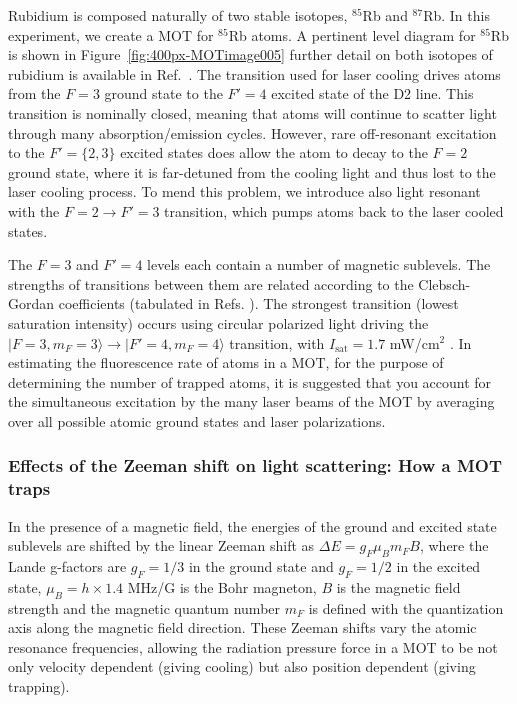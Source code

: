 \documentclass{../lab}
\begin{document}
Rubidium is composed naturally of two stable isotopes, $^{85}$Rb and $^{87}$Rb. In this experiment, we create a MOT for $^{85}$Rb atoms. A pertinent level diagram for $^{85}$Rb is shown in Figure~\ref{fig:400px-MOTimage005} further detail on both isotopes of rubidium is available in Ref.~\cite{Steck}. The transition used for laser cooling drives atoms from the $F = 3$ ground state to the $F' = 4$ excited state of the D2 line. This transition is nominally closed, meaning that atoms will continue to scatter light through many absorption/emission cycles. However, rare off-resonant excitation to the $F' = \{2,3\}$ excited states does allow the atom to decay to the $F = 2$ ground state, where it is far-detuned from the cooling light and thus lost to the laser cooling process. To mend this problem, we introduce also light resonant with the $F = 2 \rightarrow F' = 3$ transition, which pumps atoms back to the laser cooled states.

The $F = 3$ and $F' = 4$ levels each contain a number of magnetic sublevels. The strengths of transitions between them are related according to the Clebsch-Gordan coefficients (tabulated in Refs. \cite{Metcalf,Steck}). The strongest transition (lowest saturation intensity) occurs using circular polarized light driving the $|F = 3, m_F = 3\rangle \rightarrow |F' = 4, m_F = 4\rangle$ transition, with $ I_\text{sat} = 1.7$ mW/cm$^2$ \cite{Steck}. In estimating the fluorescence rate of atoms in a MOT, for the purpose of determining the number of trapped atoms, it is suggested that you account for the simultaneous excitation by the many laser beams of the MOT by averaging over all possible atomic ground states and laser polarizations.

\subsubsection{Effects of the Zeeman shift on light scattering: How a MOT traps}

In the presence of a magnetic field, the energies of the ground and excited state sublevels are shifted by the linear Zeeman shift as $\Delta E = g_F\mu_Bm_FB$, where the Lande g-factors are $ g_F = 1/3$ in the ground state and $ g_F = 1/2$ in the excited state, $\mu_B = h \times 1.4$ MHz/G is the Bohr magneton, $ B$ is the magnetic field strength and the magnetic quantum number $ m_F$ is defined with the quantization axis along the magnetic field direction. These Zeeman shifts vary the atomic resonance frequencies, allowing the radiation pressure force in a MOT to be not only velocity dependent (giving cooling) but also position dependent (giving trapping).
\end{document}
